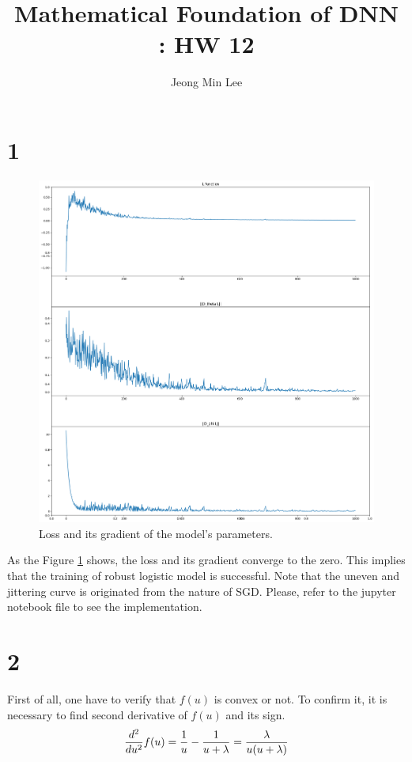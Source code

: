 \documentclass[10pt]{article}
\title{\textbf{Mathematical Foundation of DNN : HW 12}}
\author{Jeong Min Lee}
\begin{document}
\maketitle

\section*{1}

\begin{figure}[!h]
    \begin{center}
        \includegraphics[scale = 0.3]{fig1.png}
        \caption{Loss and its gradient of the model's parameters. }
        \label{fig1}
    \end{center}
\end{figure}
As the Figure \ref{fig1} shows, the loss and its gradient converge to the zero.
This implies that the training of robust logistic model is successful.
Note that the uneven and jittering curve is originated from the nature of SGD.
Please, refer to the jupyter notebook file to see the implementation. 
\section*{2}
First of all, one have to verify that $f(u)$ is convex or not. To confirm it, it is necessary to find second derivative of $f(u)$ and its sign.
\begin{align*}
    {d^2 \over du^2} f(u) = \frac{1}{u} - \frac{1}{u+\lambda} = \frac{\lambda}{u(u+\lambda)}
\end{align*} 
\end{document}
